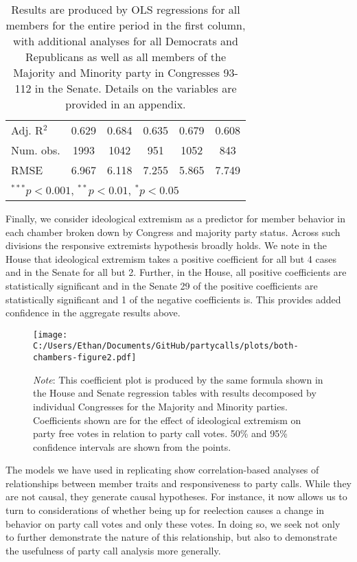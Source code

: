 \documentclass[12pt]{article}
\newcommand\fnote[1]{\captionsetup{font=small}\caption*{#1}}
\begin{document}
\begin{table}[H]
\begin{center}
\begin{tabular}{l c c c c c }
			Adj. R$^2$             & 0.629          & 0.684         & 0.635          & 0.679          & 0.608         \\
			Num. obs.              & 1993           & 1042          & 951            & 1052           & 843           \\
			RMSE                   & 6.967          & 6.118         & 7.255          & 5.865          & 7.749         \\
			\hline
			\multicolumn{6}{l}{\scriptsize{$^{***}p<0.001$, $^{**}p<0.01$, $^*p<0.05$}}
		\end{tabular}
		\fnote{Results are produced by OLS regressions for all members for the entire period in the first column, with additional analyses for all Democrats and Republicans as well as all members of the Majority and Minority party in Congresses 93-112 in the Senate. Details on the variables are provided in an appendix.}
	\end{center}
\end{table}

Finally, we consider ideological extremism as a predictor for member behavior in each chamber broken down by Congress and majority party status. Across such divisions the responsive extremists hypothesis broadly holds. We note in the House that ideological extremism takes a positive coefficient for all but 4 cases and in the Senate for all but 2. Further, in the House, all positive coefficients are statistically significant and in the Senate 29 of the positive coefficients are statistically significant and 1 of the negative coefficients is. This provides added confidence in the aggregate results above.

\begin{figure}[H]
	\centering
	\caption{Ideology and Responsiveness to Party Calls, Congresses 93-112}
	\texttt{[image: C:/Users/Ethan/Documents/GitHub/partycalls/plots/both-chambers-figure2.pdf]}
	\fnote{\textit{Note}: This coefficient plot is produced by the same formula shown in the House and Senate regression tables with results decomposed by individual Congresses for the Majority and Minority parties. Coefficients shown are for the effect of ideological extremism on party free votes in relation to party call votes. 50\% and 95\% confidence intervals are shown from the points.}
\end{figure} 

The models we have used in replicating \cite{Minozzi:2013} show correlation-based analyses of relationships between member traits and responsiveness to party calls. While they are not causal, they generate causal hypotheses. For instance, it now allows us to turn to considerations of whether being up for reelection causes a change in behavior on party call votes and only these votes. In doing so, we seek not only to further demonstrate the nature of this relationship, but also to demonstrate the usefulness of party call analysis more generally.
\end{document}
